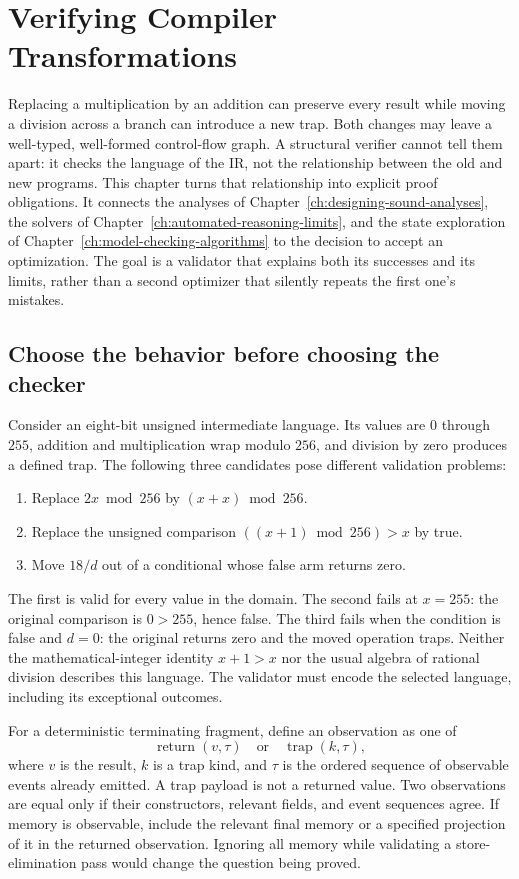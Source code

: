 \chapter{Verifying Compiler Transformations}
\label{ch:verifying-compiler-transformations}

Replacing a multiplication by an addition can preserve every result while moving a division across a branch can introduce a new trap.
Both changes may leave a well-typed, well-formed control-flow graph.
A structural verifier cannot tell them apart: it checks the language of the IR, not the relationship between the old and new programs.
This chapter turns that relationship into explicit proof obligations.
It connects the analyses of Chapter~\ref{ch:designing-sound-analyses}, the solvers of Chapter~\ref{ch:automated-reasoning-limits}, and the state exploration of Chapter~\ref{ch:model-checking-algorithms} to the decision to accept an optimization.
The goal is a validator that explains both its successes and its limits, rather than a second optimizer that silently repeats the first one's mistakes.

\section{Choose the behavior before choosing the checker}
\label{sec:ch47-behavior}

Consider an eight-bit unsigned intermediate language.
Its values are $0$ through $255$, addition and multiplication wrap modulo $256$, and division by zero produces a defined trap.
The following three candidates pose different validation problems:
\begin{enumerate}
\item Replace $2x \bmod 256$ by $(x+x)\bmod 256$.
\item Replace the unsigned comparison $((x+1)\bmod 256)>x$ by true.
\item Move $18/d$ out of a conditional whose false arm returns zero.
\end{enumerate}
The first is valid for every value in the domain.
The second fails at $x=255$: the original comparison is $0>255$, hence false.
The third fails when the condition is false and $d=0$: the original returns zero and the moved operation traps.
Neither the mathematical-integer identity $x+1>x$ nor the usual algebra of rational division describes this language.
The validator must encode the selected language, including its exceptional outcomes.

For a deterministic terminating fragment, define an observation as one of
\[
  \operatorname{return}(v,\tau)
  \quad\text{or}\quad
  \operatorname{trap}(k,\tau),
\]
where $v$ is the result, $k$ is a trap kind, and $\tau$ is the ordered sequence of observable events already emitted.
A trap payload is not a returned value.
Two observations are equal only if their constructors, relevant fields, and event sequences agree.
If memory is observable, include the relevant final memory or a specified projection of it in the returned observation.
Ignoring all memory while validating a store-elimination pass would change the question being proved.

